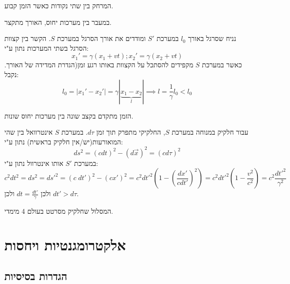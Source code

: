 \documentclass{tstextbook}
\begin{document}
\begin{definition}[אורך]
המרחק בין שתי נקודות כאשר הזמן קבוע.

\end{definition}
\begin{definition}
במעבר בין מערכות יחוס, האורך מתקצר.

\end{definition}
\begin{example}
נניח שסרגל באורך \(l_{0}\) במערכת \(S'\) ומודדים את אורך הסרגל במערכת \(S\). 
הקשר בין קצוות הסרגל בשתי המערכות נתון ע"י:
$$x_{1}'=\gamma(x_{1}+vt);x_{2}'=\gamma(x_{2}+vt)$$
כאשר במערכת \(S\) מקפידים להסתכל על הקצוות באותו רגע זמן(הגדרת המדידה של האורך. נקבל:
$$l_{0}=|x_{1}'-x_{2}'|=\gamma|\underbrace{ x_{1}-x_{2} }_{ l }|\implies l=\frac{1}{\gamma}l_{0}<l_{0}$$

\end{example}
\begin{definition}
הזמן מתקדם בקצב שונה בין מערכות יחוס שונות.

\end{definition}
\begin{example}
עבור חלקיק במנוחה במערכת \(S\), החלקיקי מתפרק תוך זמן \(d\tau\). 
במערכת \(S\) אינטרוואל בין שהי המואורעות(יש/אין חלקיק בראשית) נתון ע"י:
$$ds^2=(cdt)^2 - { \left( d\vec{x} \right)^2 }=\left( cd\tau \right)^2$$
במערכת \(S'\) אותו אינטרוול נתון ע"י:
$$c^2dt^2=ds^2=ds'^2=\left( c\;dt' \right)^2-(cx')^2=c^2dt'^2\left( 1-\left( \frac{dx'}{cdt'} \right)^2 \right)=c^2dt'^2\left( 1-\frac{v^2}{c^2} \right)=c^2 \frac{dt'^2}{\gamma ^2}$$
ולכן \(dt=\frac{dt'}{\gamma}\) ולכן \(dt'>d\tau\).

\end{example}
\begin{definition}[קו עולם]
המסלול שחלקיק מסרטט בעולם 4 מימדי.

\end{definition}
\section{אלקטרומגנטיות ויחסות}

\subsection{הגדרות בסיסיות}
\end{document}

